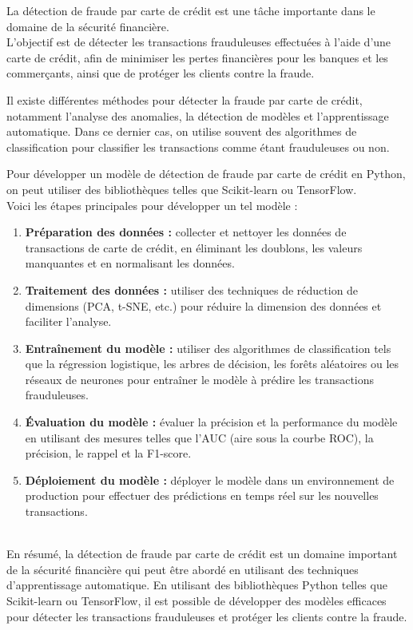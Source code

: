 \par La détection de fraude par carte de crédit est une tâche importante dans le domaine de la sécurité financière.\\
L'objectif est de détecter les transactions frauduleuses effectuées à l'aide d'une carte de crédit, afin de minimiser les pertes financières pour les banques et les commerçants, ainsi que de protéger les clients contre la fraude.

Il existe différentes méthodes pour détecter la fraude par carte de crédit, notamment l'analyse des anomalies, la détection de modèles et l'apprentissage automatique. Dans ce dernier cas, on utilise souvent des algorithmes de classification pour classifier les transactions comme étant frauduleuses ou non.

Pour développer un modèle de détection de fraude par carte de crédit en Python, on peut utiliser des bibliothèques telles que Scikit-learn ou TensorFlow.\\
Voici les étapes principales pour développer un tel modèle :

\begin{enumerate}
  \item  \textbf{Préparation des données :} collecter et nettoyer les données de transactions de carte de crédit, en éliminant les doublons, les valeurs manquantes et en normalisant les données.
  
  \item  \textbf{Traitement des données :} utiliser des techniques de réduction de dimensions (PCA, t-SNE, etc.) pour réduire la dimension des données et faciliter l'analyse.
  
  \item  \textbf{Entraînement du modèle :} utiliser des algorithmes de classification tels que la régression logistique, les arbres de décision, les forêts aléatoires ou les réseaux de neurones pour entraîner le modèle à prédire les transactions frauduleuses.
  
  \item  \textbf{Évaluation du modèle :} évaluer la précision et la performance du modèle en utilisant des mesures telles que l'AUC (aire sous la courbe ROC), la précision, le rappel et la F1-score.

  \item  \textbf{Déploiement du modèle :} déployer le modèle dans un environnement de production pour effectuer des prédictions en temps réel sur les nouvelles transactions.
\end{enumerate}




\\
En résumé, la détection de fraude par carte de crédit est un domaine important de la sécurité financière qui peut être abordé en utilisant des techniques d'apprentissage automatique. En utilisant des bibliothèques Python telles que Scikit-learn ou TensorFlow, il est possible de développer des modèles efficaces pour détecter les transactions frauduleuses et protéger les clients contre la fraude.
